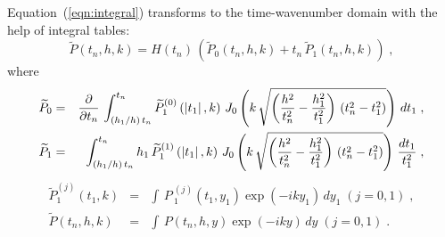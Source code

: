 Equation~(\ref{eqn:integral}) transforms to the time-wavenumber domain
with the help of integral tables:
\begin{equation}
\widetilde{P}(t_n,h,k)=
H(t_n)\,\left(\widetilde{P}_0(t_n,h,k) +
t_n\,\widetilde{P}_1(t_n,h,k)\right)\;,
\label{eqn:pp0p1} 
\end{equation}
where
\begin{eqnarray}
\widetilde{P}_0  & = & 
{\partial \over {\partial t_n}}\,
\int_{\left(h_1/h\right)\,t_n}^{t_n}
\widetilde{P}^{(0)}_1\left(\left|t_1\right|,k\right)\,
J_0\left(k\,\sqrt{\left({h^2 \over t_n^2}-{h_1^2 \over t_1^2}\right)\,
\left(t_n^2-t_1^2\right)}\right)\,dt_1\;,
\label{eqn:p0} \\
\widetilde{P}_1  & = & 
\int_{\left(h_1/h\right)\,t_n}^{t_n}
h_1\,\widetilde{P}^{(1)}_1\left(\left|t_1\right|,k\right)\,
J_0\left(k\,\sqrt{\left({h^2 \over t_n^2}-{h_1^2 \over t_1^2}\right)\,
\left(t_n^2-t_1^2\right)}\right)\,{dt_1 \over t_1^2}\;,
\label{eqn:p1} 
\end{eqnarray}
\begin{eqnarray}
\widetilde{P}^{(j)}_1(t_1,k) & = & 
\int\,P\,^{(j)}_1(t_1,y_1)\exp (-iky_1)\,dy_1\;(j=0,1)\;,
\label{eqn:tildej} \\
\widetilde{P}(t_n,h,k)  & = & 
\int\,P(t_n,h,y)\exp (-iky)\,dy\;(j=0,1)\;.
\label{eqn:tilde}
\end{eqnarray}

